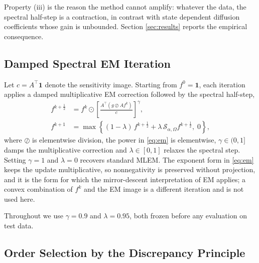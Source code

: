 Property (iii) is the reason the method cannot amplify: whatever the data,
the spectral half-step is a contraction, in contrast with state dependent
diffusion coefficients whose gain is unbounded. Section \ref{sec:results}
reports the empirical consequence.

\subsection{Damped Spectral EM Iteration}
\label{sec:iteration}

Let $c=A^{\!\top}\mathbf{1}$ denote the sensitivity image. Starting from
$f^{0}=\mathbf{1}$, each iteration applies a damped multiplicative EM
correction followed by the spectral half-step,
\begin{align}
  f^{k+\frac{1}{2}}
  &= f^{k}\odot\left[\frac{A^{\!\top}\!\left(g\oslash Af^{k}\right)}{c}\right]^{\gamma},
  \label{eq:em}\\[2pt]
  f^{k+1}
  &= \max\!\left\{(1-\lambda)\,f^{k+\frac{1}{2}}
     +\lambda\,\mathcal{S}_{\alpha,\Omega}f^{k+\frac{1}{2}},\;0\right\},
  \label{eq:spectral}
\end{align}
where $\oslash$ is elementwise division, the power in \eqref{eq:em} is
elementwise, $\gamma\in(0,1]$ damps the multiplicative correction and
$\lambda\in[0,1]$ relaxes the spectral step. Setting $\gamma=1$ and
$\lambda=0$ recovers standard MLEM. The exponent form in \eqref{eq:em} keeps
the update multiplicative, so nonnegativity is preserved without projection,
and it is the form for which the mirror-descent interpretation of EM applies;
a convex combination of $f^{k}$ and the EM image is a different iteration and
is not used here.

Throughout we use $\gamma=0.9$ and $\lambda=0.95$, both frozen before any
evaluation on test data.

\subsection{Order Selection by the Discrepancy Principle}
\label{sec:alpha}


